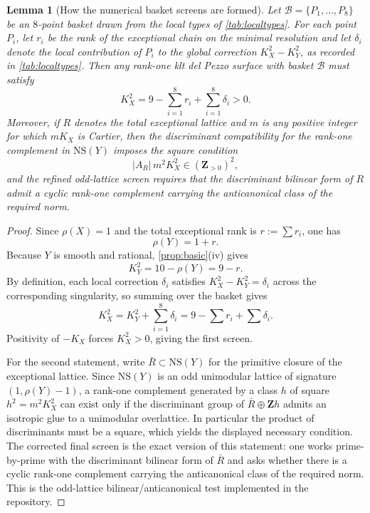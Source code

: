 \documentclass[11pt]{article}
\newtheorem{lemma}[lemma]{Lemma}
\theoremstyle{definition}
\newcommand{\NS}{\mathrm{NS}}
\begin{document}
\begin{lemma}[How the numerical basket screens are formed]\label{lem:basket-screens}
Let $\mathcal B=\{P_1,\dots,P_8\}$ be an $8$-point basket drawn from the local types of \cref{tab:localtypes}. For each point $P_i$, let $r_i$ be the rank of the exceptional chain on the minimal resolution and let $\delta_i$ denote the local contribution of $P_i$ to the global correction $K_X^2-K_Y^2$, as recorded in \cref{tab:localtypes}. Then any rank-one klt del Pezzo surface with basket $\mathcal B$ must satisfy
\[
K_X^2 = 9-\sum_{i=1}^8 r_i + \sum_{i=1}^8 \delta_i > 0.
\]
Moreover, if $R$ denotes the total exceptional lattice and $m$ is any positive integer for which $mK_X$ is Cartier, then the discriminant compatibility for the rank-one complement in $\NS(Y)$ imposes the square condition
\[
|A_R|\,m^2K_X^2\in (\mathbf Z_{>0})^2,
\]
and the refined odd-lattice screen requires that the discriminant bilinear form of $R$ admit a cyclic rank-one complement carrying the anticanonical class of the required norm.
\end{lemma}

\begin{proof}
Since $\rho(X)=1$ and the total exceptional rank is $r:=\sum r_i$, one has
\[
\rho(Y)=1+r.
\]
Because $Y$ is smooth and rational, \cref{prop:basic}(iv) gives
\[
K_Y^2 = 10-\rho(Y)=9-r.
\]
By definition, each local correction $\delta_i$ satisfies $K_X^2-K_Y^2=\delta_i$ across the corresponding singularity, so summing over the basket gives
\[
K_X^2 = K_Y^2+\sum_{i=1}^8 \delta_i = 9-\sum r_i+\sum \delta_i.
\]
Positivity of $-K_X$ forces $K_X^2>0$, giving the first screen.

For the second statement, write $\bar R\subset \NS(Y)$ for the primitive closure of the exceptional lattice. Since $\NS(Y)$ is an odd unimodular lattice of signature $(1,\rho(Y)-1)$, a rank-one complement generated by a class $h$ of square $h^2=m^2K_X^2$ can exist only if the discriminant group of $\bar R\oplus \mathbf Zh$ admits an isotropic glue to a unimodular overlattice. In particular the product of discriminants must be a square, which yields the displayed necessary condition. The corrected final screen is the exact version of this statement: one works prime-by-prime with the discriminant bilinear form of $\bar R$ and asks whether there is a cyclic rank-one complement carrying the anticanonical class of the required norm. This is the odd-lattice bilinear/anticanonical test implemented in the repository.
\end{proof}
\end{document}
